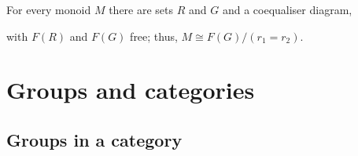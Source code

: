 \documentclass{article}
\begin{document}
\begin{proposition}[Awodey 3.24]
    For every monoid $M$ there are sets $R$ and $G$ and a coequaliser diagram,
    \begin{center}
    \end{center}
    with $F(R)$ and $F(G)$ free; thus, $M\cong F(G)/(r_1=r_2)$.
\end{proposition}

\section{Groups and categories}

\subsection{Groups in a category}
\end{document}
